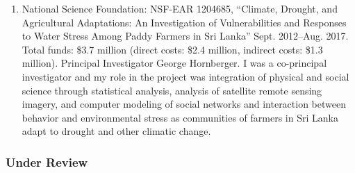 \begin{enumerate}
    \item National Science Foundation: NSF-EAR 1204685, ``Climate, Drought, and Agricultural Adaptations: An Investigation of Vulnerabilities and Responses to Water Stress Among Paddy Farmers in Sri Lanka'' Sept. 2012--Aug. 2017. Total funds: \$3.7 million (direct costs: \$2.4 million, indirect costs: \$1.3 million). Principal Investigator George Hornberger. I was a co-principal investigator and my role in the project was integration of physical and social science through statistical analysis, analysis of satellite remote sensing imagery, and computer modeling of social networks and interaction between behavior and environmental stress as communities of farmers in Sri Lanka adapt to drought and other climatic change.
\end{enumerate}
\iffalse
\subsubsection{Under Review}
